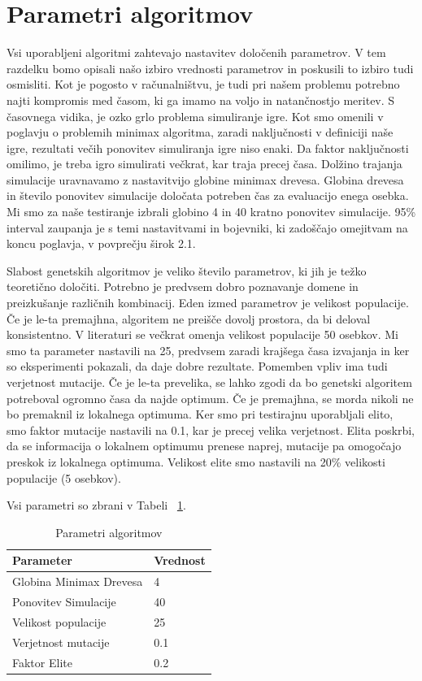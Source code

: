 \documentclass[12pt,a4paper,openany]{book}
\begin{document}
\section{Parametri algoritmov}
Vsi uporabljeni algoritmi zahtevajo nastavitev določenih parametrov. V tem razdelku bomo opisali našo izbiro vrednosti parametrov in poskusili to izbiro tudi osmisliti.
Kot je pogosto v računalništvu, je tudi pri našem problemu potrebno najti kompromis med časom, ki ga imamo na voljo in natančnostjo meritev. S časovnega vidika, je ozko grlo problema simuliranje igre. Kot smo omenili v poglavju o problemih minimax algoritma, zaradi naključnosti v definiciji naše igre, rezultati večih ponovitev simuliranja igre niso enaki. Da faktor naključnosti omilimo, je treba igro simulirati večkrat, kar traja precej časa. Dolžino trajanja simulacije uravnavamo z nastavitvijo globine minimax drevesa. Globina drevesa in število ponovitev simulacije določata potreben čas za evaluacijo enega osebka. Mi smo za naše testiranje izbrali globino 4 in 40 kratno ponovitev simulacije. 95\% interval zaupanja je s temi nastavitvami in bojevniki, ki zadoščajo omejitvam na koncu poglavja, v povprečju širok 2.1.

Slabost genetskih algoritmov je veliko število parametrov, ki jih je težko teoretično določiti. Potrebno je predvsem dobro poznavanje domene in preizkušanje različnih kombinacij. Eden izmed parametrov je velikost populacije. Če je le-ta premajhna, algoritem ne preišče dovolj prostora, da bi deloval konsistentno. V literaturi se večkrat omenja velikost populacije 50 osebkov. Mi smo ta parameter nastavili na 25, predvsem zaradi krajšega časa izvajanja in ker so eksperimenti pokazali, da daje dobre rezultate. Pomemben vpliv ima tudi verjetnost mutacije. Če je le-ta prevelika, se lahko zgodi da bo genetski algoritem potreboval ogromno časa da najde optimum. Če je premajhna, se morda nikoli ne bo premaknil iz lokalnega optimuma. Ker smo pri testirajnu uporabljali elito, smo faktor mutacije nastavili na 0.1, kar je precej velika verjetnost. Elita poskrbi, da se informacija o lokalnem optimumu prenese naprej, mutacije pa omogočajo preskok iz lokalnega optimuma. Velikost elite smo nastavili na 20\% velikosti populacije (5 osebkov).

Vsi parametri so zbrani v Tabeli ~\ref{table:parametris}.

\begin{table}[ht] 
 \centering
\begin{tabular}{ll}
\hline\hline
Parameter & Vrednost \\ [0.5ex]
\hline 
Globina Minimax Drevesa & 4\\
Ponovitev Simulacije & 40\\
Velikost populacije & 25\\ 
Verjetnost mutacije & 0.1\\ 
Faktor Elite & 0.2\\ [1ex]
\hline %
\end{tabular}
\caption{Parametri algoritmov}
\label{table:parametris} %
\end{table}
\end{document}
